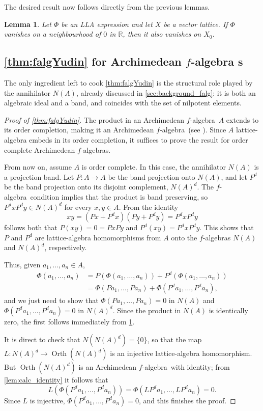 \documentclass{memo-l}
\newtheorem{lem}[theorem]{Lemma}
\theoremstyle{definition}
\theoremstyle{remark}
\numberwithin{section}{chapter}
\numberwithin{equation}{chapter}
\newcommand\R{\ensuremath{\mathbb{R}}}
\newcommand{\falg}{$f\!$-algebra}
\newcommand{\orth}[1]{\operatorname{Orth}(#1)}
\begin{document}
The desired result now follows directly from the previous lemmas.

\begin{lem}\label{lem:calc_zero}
    Let $\Phi $ be an LLA expression and let $X$ be a vector lattice. If $\Phi $
    vanishes on a neighbourhood of $0$ in $\R$, then it also vanishes on $X_0$.
\end{lem}

\subsection{\cref{thm:falgYudin} for Archimedean \falg
s}\label{sec:proof_falgYudin}

The only ingredient left to cook \cref{thm:falgYudin} is the
structural role played by the annihilator $N(A)$, already discussed
in \cref{sec:background_falg}: it is both an algebraic ideal and a band, and coincides with
the set of nilpotent elements.

\begin{proof}[Proof of \cref{thm:falgYudin}]
    The product in an Archimedean \falg\ $A$ extends to its order
    completion, making it an Archimedean \falg\ (see \cite[Section
    7]{huijsmans1991}). Since $A$ lattice-algebra embeds in its order
    completion, it suffices
    to prove the result for order complete Archimedean \falg s.

    From now on, assume $A$ is order complete. In this case, the
    annihilator $N(A)$ is a
    projection band. Let $P\colon A\to A$ be the band projection onto
    $N(A)$, and let $P^{d}$ be the band projection onto its disjoint
    complement, $N(A)^{d}$. The
    \falg\ condition implies that the product is band
    preserving, so $P^{d}xP^{d}y \in N(A)^{d}$ for every $x,y \in A$.
    From the identity
    \[
        xy=(Px+P^{d}x)(Py+P^{d}y)=P^{d}xP^dy
    \]
    follows both that $P(xy)=0=Px Py$ and
    $P^{d}(xy)=P^{d}xP^{d}y$. This shows that $P$ and $P^{d}$ are
    lattice-algebra homomorphisms from $A$ onto the \falg s $N(A)$ and
    $N(A)^{d}$, respectively.

    Thus, given $a_1,\ldots, a_n \in A$,
    \begin{align*}
        \Phi (a_1,\ldots ,a_n)&=P(\Phi (a_1,\ldots ,a_n))+ P^{d}(\Phi
        (a_1,\ldots ,a_n))\\&=\Phi (Pa_1,\ldots ,Pa_n)+\Phi (P^{d}a_1,\ldots
    ,P^{d}a_n),
    \end{align*}
    and we just need to show that $\Phi (Pa_1,\ldots ,Pa_n)=0$ in
    $N(A)$ and $\Phi (P^{d}a_1,\ldots, P^{d}a_n)=0$ in $N(A)^{d}$.
    Since the product in $N(A)$ is identically zero, the first follows
    immediately from \cref{lem:calc_zero}.

    It is direct to check that $N(N(A)^{d})=\{0\}$, so that the map
    $L\colon N(A)^{d}\to \orth{N(A)^{d}}$ is an injective
    lattice-algebra homomorphism. But $\orth{N(A)^{d}}$ is an
    Archimedean \falg\
    with identity; from \cref{lem:calc_identity} it follows that
    \[
    L(\Phi (P^{d}a_1,\ldots ,P^{d}a_n))=\Phi (LP^{d}a_1,\ldots
    ,LP^{d}a_n)=0.
    \]
    Since $L$ is injective, $\Phi (P^{d}a_1,\ldots ,P^{d}a_n)=0$, and
    this finishes the proof.
\end{proof}
\end{document}
